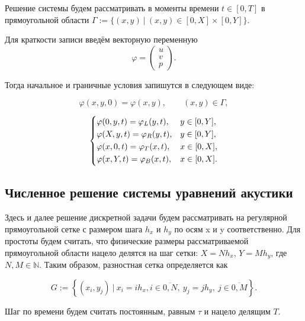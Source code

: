 Решение системы будем рассматривать в моменты времени $t \in [0, T]$ в прямоугольной области $\Gamma := \{(x,y) ~|~ (x,y) \in [0, X]\times [0, Y]\}$.

Для краткости записи введём векторную переменную
\begin{equation}
	\varphi = \begin{pmatrix} u \\ v \\ p \end{pmatrix} .
    \label{eq:phi}
\end{equation}

\noindent Тогда начальное и граничные условия запишутся в следующем виде:

\begin{equation*}
    \varphi(x,y,0) = \varphi(x,y) ,\qquad (x,y) \in \Gamma,
\end{equation*}

\begin{equation*}
\begin{dcases}
    \varphi(0,y,t) = \varphi_L (y,t) , & y \in [0,Y] ,\\
    \varphi(X,y,t) = \varphi_R (y,t) , & y \in [0,Y] ,\\
    \varphi(x,0,t) = \varphi_T (x,t) , & x \in [0,X] ,\\
    \varphi(x,Y,t) = \varphi_B (x,t) , & x \in [0,X] .
\end{dcases}
\end{equation*}

\subsection{Численное решение системы уравнений акустики}

Здесь и далее решение дискретной задачи будем рассматривать на регулярной прямоугольной сетке с размером шага $h_x$ и $h_y$ по осям x и y соответственно. Для простоты будем считать, что физические размеры рассматриваемой прямоугольной области нацело делятся на шаг сетки: $X=N h_x$, $Y = M h_y$, где $N,M \in \mathbb{N}$. Таким образом, разностная сетка определяется как 

\begin{equation*}
    G := \left\{(x_i, y_j) ~|~ x_i = ih_x, i \in \overline{0,N},~y_j = jh_y,~j \in \overline{0,M} \right\} .
\end{equation*}

\noindent Шаг по времени будем считать постоянным, равным $\tau$ и нацело делящим $T$.

